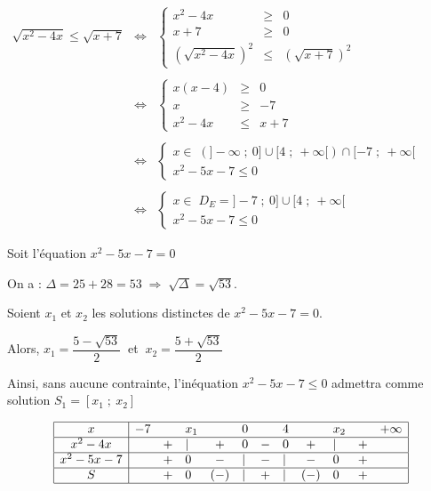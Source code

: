 \documentclass[12pt]{article}
\newcounter{solution}
\begin{document}
$\begin{array}{rcl} \sqrt{x^{2}-4x}\leq\sqrt{x+7} & \Leftrightarrow & \left\lbrace\begin{array}{rcl} x^{2}-4x&\geq&0 \\ x+7&\geq&0 \\ (\sqrt{x^{2}-4x})^{2}&\leq&(\sqrt{x+7})^{2} \end{array}\right. \\ \\ & \Leftrightarrow & \left\lbrace\begin{array}{rcl} x(x-4)&\geq&0 \\ x&\geq&-7 \\ x^{2}-4x&\leq&x+7 \end{array}\right. \\ \\ & \Leftrightarrow & \left\lbrace\begin{array}{lll} x\in\;(]-\infty\;;\ 0]\cup[4\;;\ +\infty[)\cap[-7\;;\ +\infty[ \\ x^{2}-5x-7\leq 0 \end{array}\right. \\ \\  & \Leftrightarrow & \left\lbrace\begin{array}{lll} x\in\;D_{E}=]-7\;;\ 0]\cup[4\;;\ +\infty[ \\ x^{2}-5x-7\leq 0 \end{array}\right. \end{array}$

Soit l'équation $x^{2}-5x-7=0$

On a : $\Delta=25+28=53\;\Rightarrow\;\sqrt{\Delta}=\sqrt{53}.$

Soient $x_{1}$ et $x_{2}$ les solutions distinctes de $x^{2}-5x-7=0$.

Alors, $x_{1}=\dfrac{5-\sqrt{53}}{2}\ $ et $\ x_{2}=\dfrac{5+\sqrt{53}}{2}$

Ainsi, sans aucune contrainte, l'inéquation $x^{2}-5x-7\leq 0$ admettra comme solution $S_{1}=[x_{1}\;;\ x_{2}]$

$$\begin{array}{|c|lclclclclcr|} \hline x & -7 & & x_{1} &  & 0 &  & 4 & & x_{2} & & +\infty \\ \hline x^{2}-4x & & + & | & + & 0 & - & 0 & + &|& + & \\ \hline x^{2}-5x-7 &  & + & 0 & - & | & - & | & - & 0 & + & \\ \hline S &  & + & 0 & (-) & | & + & |& (-) & 0 & + & \\ \hline \end{array}$$
\end{document}
